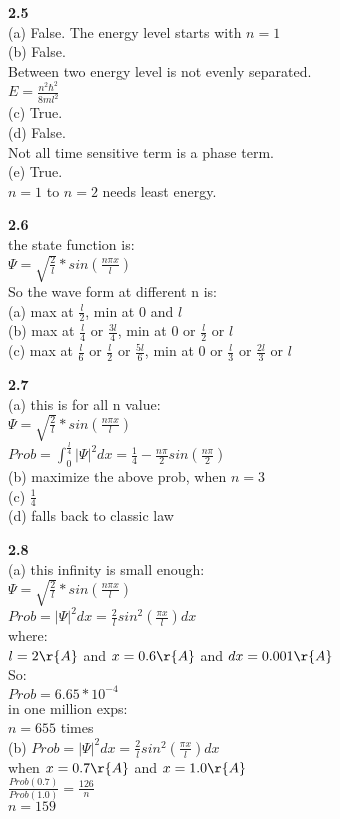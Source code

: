 \documentclass{article}
\begin{document}
\textbf{2.5}\\
(a) False.
The energy level starts with $n=1$\\
(b) False.\\
Between two energy level is not evenly separated.\\
$E = \frac{n^2\hbar^2}{8ml^2}$\\
(c) True.\\
(d) False.\\
Not all time sensitive term is a phase term.\\
(e) True.\\
$n=1$ to $n=2$ needs least energy.\\
\newline

\textbf{2.6}\\
the state function is:\\
$\Psi = \sqrt{\frac{2}{l}}*sin(\frac{n\pi x}{l})$\\
So the wave form at different n is:\\
(a) max at $\frac{l}{2}$, min at $0$ and $l$\\
(b) max at $\frac{l}{4}$ or $\frac{3l}{4}$, min at $0$ or $\frac{l}{2}$ or $l$\\
(c) max at $\frac{l}{6}$ or $\frac{l}{2}$ or $\frac{5l}{6}$, min at $0$ or $\frac{l}{3}$ or $\frac{2l}{3}$ or $l$\\
\newline

\textbf{2.7}\\
(a) this is for all n value:\\
$\Psi = \sqrt{\frac{2}{l}}*sin(\frac{n\pi x}{l})$\\
$Prob = \int_0^{\frac{l}{4}}|\Psi|^2dx = \frac{1}{4} - \frac{n\pi}{2}sin(\frac{n\pi}{2})$\\
(b) maximize the above prob, when $n=3$\\
(c) $\frac{1}{4}$\\
(d) falls back to classic law\\
\newline

\textbf{2.8}\\
(a) this infinity is small enough:\\
$\Psi = \sqrt{\frac{2}{l}}*sin(\frac{n\pi x}{l})$\\
$Prob = |\Psi|^2dx = \frac{2}{l}sin^2(\frac{\pi x}{l})dx$\\
where:\\
$l = 2\r{A}$ and $x = 0.6\r{A}$ and $dx = 0.001\r{A}$\\
So:\\
$Prob = 6.65*10^{-4}$\\
in one million exps:\\
$n = 655$ times\\
(b) $Prob = |\Psi|^2dx = \frac{2}{l}sin^2(\frac{\pi x}{l})dx$\\
when $x = 0.7\r{A}$ and $x = 1.0\r{A}$\\
$\frac{Prob(0.7)}{Prob(1.0)} = \frac{126}{n}$\\
$n = 159$
\newline
\end{document}

